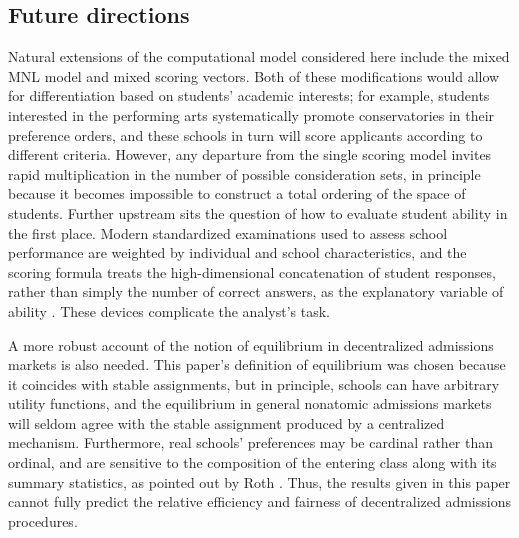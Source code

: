 \documentclass[12pt]{article}
\numberwithin{equation}{subsection}
\theoremstyle{definition}
\begin{document}
\subsection{Future directions}
Natural extensions of the computational model considered here include the mixed MNL model and mixed scoring vectors. Both of these modifications would allow for differentiation based on students' academic interests; for example, students interested in the performing arts systematically promote conservatories in their preference orders, and these schools in turn will score applicants according to different criteria. However, any departure from the single scoring model invites rapid multiplication in the number of possible consideration sets, in principle because it becomes impossible to construct a total ordering of the space of students. Further upstream sits the question of how to evaluate student ability in the first place. Modern standardized examinations used to assess school performance are weighted by individual and school characteristics, and the scoring formula treats the high-dimensional concatenation of student responses, rather than simply the number of correct answers, as the explanatory variable of ability \parencite[][]{measurementofstudentability}. These devices complicate the analyst's task.

A more robust account of the notion of equilibrium in decentralized admissions markets is also needed. This paper's definition of equilibrium was chosen because it coincides with stable assignments, but in principle, schools can have arbitrary utility functions, and the equilibrium in general nonatomic admissions markets will seldom agree with the stable assignment produced by a centralized mechanism. Furthermore, real schools' preferences may be cardinal rather than ordinal, and are sensitive to the composition of the entering class along with its summary statistics, as pointed out by Roth \parencite*{collegeadmissionsisnotmarriage}. Thus, the results given in this paper cannot fully predict the relative efficiency and fairness of decentralized admissions procedures. 
\end{document}
